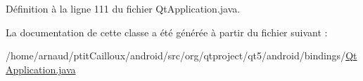 Définition à la ligne 111 du fichier Qt\-Application.\-java.



La documentation de cette classe a été générée à partir du fichier suivant \-:\begin{DoxyCompactItemize}
\item 
/home/arnaud/ptit\-Cailloux/android/src/org/qtproject/qt5/android/bindings/\hyperlink{_qt_application_8java}{Qt\-Application.\-java}\end{DoxyCompactItemize}
